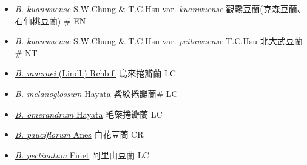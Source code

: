 \begin{itemize}
\begin{itemize}
        \item[] \href{http://www.theplantlist.org/tpl1.1/search?q=Bulbophyllum+kuanwuense+var.+kuanwuense}{\textit{B. kuanwuense} S.W.Chung \& T.C.Hsu var. \textit{kuanwuense}}        觀霧豆蘭(克森豆蘭、石仙桃豆蘭)   \# EN
        \item[] \href{http://www.theplantlist.org/tpl1.1/search?q=Bulbophyllum+kuanwuense+var.+peitawuense}{\textit{B. kuanwuense} S.W.Chung \& T.C.Hsu var. \textit{peitawuense} T.C.Hsu}   北大武豆蘭\# NT
        \item[] \href{http://www.theplantlist.org/tpl1.1/search?q=Bulbophyllum+macraei}{\textit{B. macraei} (Lindl.) Rchb.f.}   烏來捲瓣蘭 LC
        \item[] \href{http://www.theplantlist.org/tpl1.1/search?q=Bulbophyllum+melanoglossum}{\textit{B. melanoglossum} Hayata}   紫紋捲瓣蘭\# LC
        \item[] \href{http://www.theplantlist.org/tpl1.1/search?q=Bulbophyllum+omerandrum}{\textit{B. omerandrum} Hayata}   毛藥捲瓣蘭 LC
        \item[] \href{http://www.theplantlist.org/tpl1.1/search?q=Bulbophyllum+pauciflorum}{\textit{B. pauciflorum} Anes}     白花豆蘭 CR
        \item[] \href{http://www.theplantlist.org/tpl1.1/search?q=Bulbophyllum+pectinatum}{\textit{B. pectinatum} Finet}   阿里山豆蘭 LC

\end{itemize}
\end{itemize}
